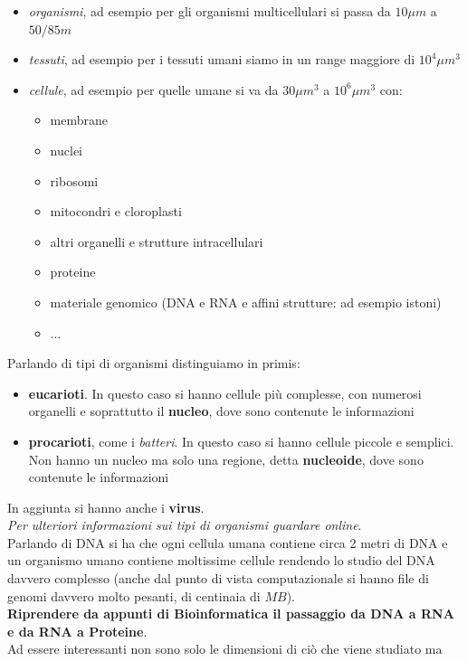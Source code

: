 \documentclass[a4paper,12pt, oneside]{book}
\begin{document}
\begin{itemize}
  \item \textit{organismi}, ad esempio per gli organismi multicellulari si passa
  da $10\mu m$ a $50/85m$ 
  \item \textit{tessuti}, ad esempio per i tessuti umani siamo in un range
  maggiore di $10^4 \mu m^3$
  \item \textit{cellule}, ad esempio per quelle umane si va da $30\mu m^3$ a
  $10^6 \mu m^3$ con:
  \begin{itemize}
    \item membrane
    \item nuclei
    \item ribosomi
    \item mitocondri e cloroplasti
    \item altri organelli e strutture intracellulari
    \item proteine
    \item materiale genomico (DNA e RNA e affini strutture: ad esempio istoni) 
    \item $\ldots$
  \end{itemize}
\end{itemize}
Parlando di tipi di organismi distinguiamo in primis:
\begin{itemize}
  \item \textbf{eucarioti}. In questo caso si hanno cellule più complesse, con
  numerosi organelli e soprattutto il \textbf{nucleo}, dove sono contenute le
  informazioni
  \item \textbf{procarioti}, come i \textit{batteri}. In questo caso si hanno
  cellule piccole e semplici. Non hanno un nucleo ma solo una regione, detta
  \textbf{nucleoide}, dove sono contenute le informazioni
\end{itemize}
In aggiunta si hanno anche i \textbf{virus}.\\
\textit{Per ulteriori informazioni sui tipi di organismi guardare online}.\\
Parlando di DNA si ha che ogni cellula umana contiene circa 2 metri di DNA e un
organismo umano contiene moltissime cellule rendendo lo studio del DNA davvero
complesso (anche dal punto di vista computazionale si hanno file di genomi
davvero molto pesanti, di centinaia di $MB$).\\
\textbf{Riprendere da appunti di Bioinformatica il passaggio da DNA a RNA e da
  RNA a Proteine}.\\
Ad essere interessanti non sono solo le dimensioni di ciò che viene studiato ma
\end{document}

